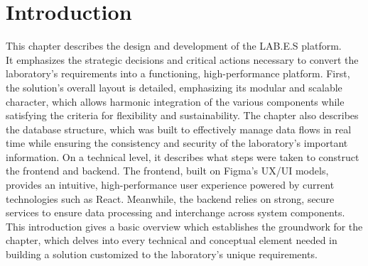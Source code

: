 \chapter{Introduction}
This chapter describes the design and development of the LAB.E.S platform. \\
It emphasizes the strategic decisions and critical actions necessary to convert the laboratory's requirements into a functioning, high-performance platform.
First, the solution's overall layout is detailed, emphasizing its modular and scalable character, which allows harmonic integration of the various components while satisfying the criteria for flexibility and sustainability.
The chapter also describes the database structure, which was built to effectively manage data flows in real time while ensuring the consistency and security of the laboratory's important information.
On a technical level, it describes what steps were taken to construct the frontend and backend. The frontend, built on Figma's UX/UI models, provides an intuitive, high-performance user experience powered by current technologies such as React. Meanwhile, the backend relies on strong, secure services to ensure data processing and interchange across system components.\\
This introduction gives a basic overview which establishes the groundwork for the chapter, which delves into every technical and conceptual element needed in building a solution customized to the laboratory's unique requirements.







